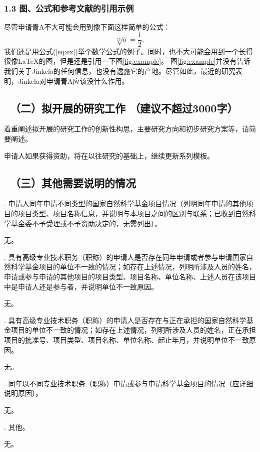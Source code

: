 \documentclass[12pt,UTF8,AutoFakeBold=3,a4paper]{ctexart} %
\newcommand{\sihao}{\fontsize{14.2pt}{\baselineskip}\selectfont}
\begin{document}
\subsubsection{1.3 图、公式和参考文献的引用示例}
尽管申请青A不大可能会用到像下面这样简单的公式：
\begin{equation}
\label{eq:ex}
\sqrt[15]{a}=\frac{1}{2},
\end{equation}
我们还是用公式(\ref{eq:ex})举个数学公式的例子。同时，也不大可能会用到一个长得很像\LaTeX 的图，但是还是引用一下图\ref{fig:example}。 图\ref{fig:example}并没有告诉我们关于Jinkela\cite{John1997,Smith1900}的任何信息，也没有透露它的产地\cite{Piter1992,grif1998}。尽管如此，最近的研究表明，Jinkela对申请青A应该没什么作用\cite{John1997}。


%


\newpage

{\color{MsBlue} \subsection{\sihao \kaishu \quad \ （二）拟开展的研究工作 \textnormal{\kaishu （建议不超过3000字） }} }
{\color{MsBlue} \kaishu \sihao 着重阐述拟开展的研究工作的创新性构思，主要研究方向和初步研究方案等，请简要阐述。}

申请人如果获得资助，将在以往研究的基础上，继续更新系列模板。

{\color{MsBlue} \subsection{\sihao \kaishu \quad \ （三）其他需要说明的情况 }}

{\sihao \color{MsBlue} . 申请人同年申请不同类型的国家自然科学基金项目情况（列明同年申请的其他项目的项目类型、项目名称信息，并说明与本项目之间的区别与联系；已收到自然科学基金委不予受理或不予资助决定的，无需列出）。}

无。

{\sihao \color{MsBlue} . 具有高级专业技术职务（职称）的申请人是否存在同年申请或者参与申请国家自然科学基金项目的单位不一致的情况；如存在上述情况，列明所涉及人员的姓名，申请或参与申请的其他项目的项目类型、项目名称、单位名称、上述人员在该项目中是申请人还是参与者，并说明单位不一致原因。}

无。

{\sihao \color{MsBlue} . 具有高级专业技术职务（职称）的申请人是否存在与正在承担的国家自然科学基金项目的单位不一致的情况；如存在上述情况，列明所涉及人员的姓名，正在承担项目的批准号、项目类型、项目名称、单位名称、起止年月，并说明单位不一致原因。}

无。

{\sihao \color{MsBlue} . 同年以不同专业技术职务（职称）申请或参与申请科学基金项目的情况（应详细说明原因）。}

无。

{\sihao \color{MsBlue} . 其他。}

无。
\end{document}
